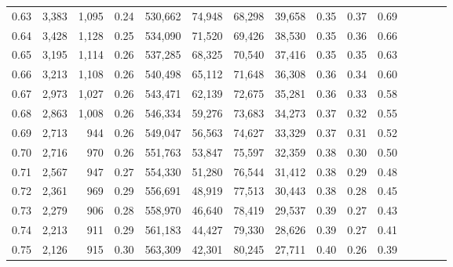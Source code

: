 \begin{tabular}{rrrcrrrrrrrrrrr}
0.63 &   3,383 &   1,095 &                                       0.24 &  530,662 &   74,948 &   68,298 &   39,658 &  0.35 &  0.37 &                         0.69 \\
0.64 &   3,428 &   1,128 &                                       0.25 &  534,090 &   71,520 &   69,426 &   38,530 &  0.35 &  0.36 &                         0.66 \\
0.65 &   3,195 &   1,114 &                                       0.26 &  537,285 &   68,325 &   70,540 &   37,416 &  0.35 &  0.35 &                         0.63 \\
0.66 &   3,213 &   1,108 &                                       0.26 &  540,498 &   65,112 &   71,648 &   36,308 &  0.36 &  0.34 &                         0.60 \\
0.67 &   2,973 &   1,027 &                                       0.26 &  543,471 &   62,139 &   72,675 &   35,281 &  0.36 &  0.33 &                         0.58 \\
0.68 &   2,863 &   1,008 &                                       0.26 &  546,334 &   59,276 &   73,683 &   34,273 &  0.37 &  0.32 &                         0.55 \\
0.69 &   2,713 &     944 &                                       0.26 &  549,047 &   56,563 &   74,627 &   33,329 &  0.37 &  0.31 &                         0.52 \\
0.70 &   2,716 &     970 &                                       0.26 &  551,763 &   53,847 &   75,597 &   32,359 &  0.38 &  0.30 &                         0.50 \\
0.71 &   2,567 &     947 &                                       0.27 &  554,330 &   51,280 &   76,544 &   31,412 &  0.38 &  0.29 &                         0.48 \\
0.72 &   2,361 &     969 &                                       0.29 &  556,691 &   48,919 &   77,513 &   30,443 &  0.38 &  0.28 &                         0.45 \\
0.73 &   2,279 &     906 &                                       0.28 &  558,970 &   46,640 &   78,419 &   29,537 &  0.39 &  0.27 &                         0.43 \\
0.74 &   2,213 &     911 &                                       0.29 &  561,183 &   44,427 &   79,330 &   28,626 &  0.39 &  0.27 &                         0.41 \\
0.75 &   2,126 &     915 &                                       0.30 &  563,309 &   42,301 &   80,245 &   27,711 &  0.40 &  0.26 &                         0.39 \\

\end{tabular}
